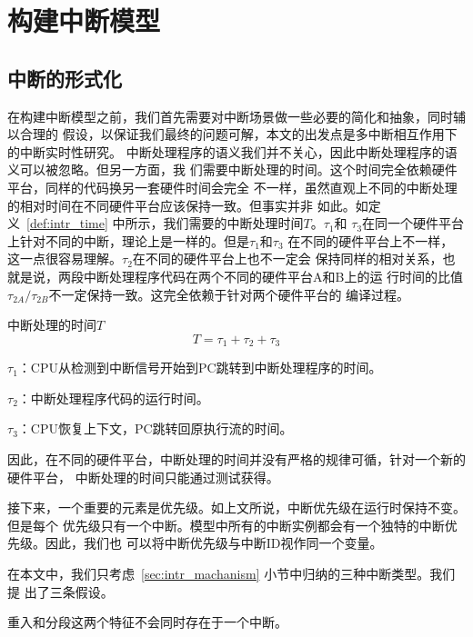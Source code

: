 \section{构建中断模型}
\label{sec:intr_model}

\subsection{中断的形式化}
\label{subsec:intr_formal}

在构建中断模型之前，我们首先需要对中断场景做一些必要的简化和抽象，同时辅以合理的
假设，以保证我们最终的问题可解，本文的出发点是多中断相互作用下的中断实时性研究。
中断处理程序的语义我们并不关心，因此中断处理程序的语义可以被忽略。但另一方面，我
们需要中断处理的时间。这个时间完全依赖硬件平台，同样的代码换另一套硬件时间会完全
不一样，虽然直观上不同的中断处理的相对时间在不同硬件平台应该保持一致。但事实并非
如此。如定义~\ref{def:intr_time} 中所示，我们需要的中断处理时间$T$。$\tau_1$和
$\tau_3$在同一个硬件平台上针对不同的中断，理论上是一样的。但是$\tau_1$和$\tau_3$
在不同的硬件平台上不一样，这一点很容易理解。$\tau_2$在不同的硬件平台上也不一定会
保持同样的相对关系，也就是说，两段中断处理程序代码在两个不同的硬件平台A和B上的运
行时间的比值$\tau_{2A}/\tau_{2B}$不一定保持一致。这完全依赖于针对两个硬件平台的
编译过程。

\begin{definition}
	中断处理的时间$T$
	\label{def:intr_time}
	\begin{equation}
	T = \tau_1 + \tau_2 + \tau_3
	\end{equation}
	
	$\tau_1$：CPU从检测到中断信号开始到PC跳转到中断处理程序的时间。
	
	$\tau_2$：中断处理程序代码的运行时间。
	
	$\tau_3$：CPU恢复上下文，PC跳转回原执行流的时间。
\end{definition}

因此，在不同的硬件平台，中断处理的时间并没有严格的规律可循，针对一个新的硬件平台，
中断处理的时间只能通过测试获得。

接下来，一个重要的元素是优先级。如上文所说，中断优先级在运行时保持不变。但是每个
优先级只有一个中断。模型中所有的中断实例都会有一个独特的中断优先级。因此，我们也
可以将中断优先级与中断ID视作同一个变量。

在本文中，我们只考虑~\ref{sec:intr_machanism} 小节中归纳的三种中断类型。我们提
出了三条假设。

\begin{assumption}
	\label{ass:not_both}
	重入和分段这两个特征不会同时存在于一个中断。
\end{assumption}

